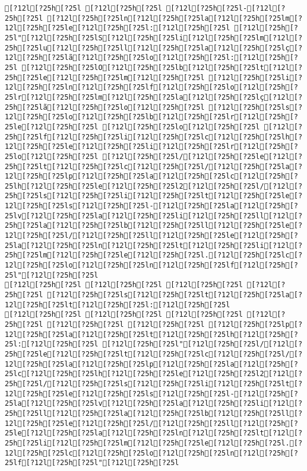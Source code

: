 \documentclass{scrartcl}
\begin{document}
\begin{Verbatim}
[?12l[?25h[?25l [?12l[?25h[?25l [?12l[?25h[?25l-[?12l[?25h[?25l [?12l[?25h[?25ln[?12l[?25h[?25la[?12l[?25h[?25lm[?12l[?25h[?25le[?12l[?25h[?25l:[?12l[?25h[?25l [?12l[?25h[?25l"[?12l[?25h[?25lS[?12l[?25h[?25li[?12l[?25h[?25lm[?12l[?25h[?25lu[?12l[?25h[?25ll[?12l[?25h[?25la[?12l[?25h[?25lç[?12l[?25h[?25lã[?12l[?25h[?25lo[?12l[?25h[?25l:[?12l[?25h[?25l [?12l[?25h[?25lO[?12l[?25h[?25lb[?12l[?25h[?25lt[?12l[?25h[?25le[?12l[?25h[?25lm[?12l[?25h[?25l [?12l[?25h[?25li[?12l[?25h[?25ln[?12l[?25h[?25lf[?12l[?25h[?25lo[?12l[?25h[?25lr[?12l[?25h[?25lm[?12l[?25h[?25la[?12l[?25h[?25lç[?12l[?25h[?25lã[?12l[?25h[?25lo[?12l[?25h[?25l [?12l[?25h[?25ls[?12l[?25h[?25lo[?12l[?25h[?25lb[?12l[?25h[?25lr[?12l[?25h[?25le[?12l[?25h[?25l [?12l[?25h[?25lo[?12l[?25h[?25l [?12l[?25h[?25lf[?12l[?25h[?25li[?12l[?25h[?25lc[?12l[?25h[?25lh[?12l[?25h[?25le[?12l[?25h[?25li[?12l[?25h[?25lr[?12l[?25h[?25lo[?12l[?25h[?25l [?12l[?25h[?25l/[?12l[?25h[?25le[?12l[?25h[?25lt[?12l[?25h[?25lc[?12l[?25h[?25l/[?12l[?25h[?25la[?12l[?25h[?25lp[?12l[?25h[?25la[?12l[?25h[?25lc[?12l[?25h[?25lh[?12l[?25h[?25le[?12l[?25h[?25l2[?12l[?25h[?25l/[?12l[?25h[?25ls[?12l[?25h[?25li[?12l[?25h[?25lt[?12l[?25h[?25le[?12l[?25h[?25ls[?12l[?25h[?25l-[?12l[?25h[?25la[?12l[?25h[?25lv[?12l[?25h[?25la[?12l[?25h[?25li[?12l[?25h[?25ll[?12l[?25h[?25la[?12l[?25h[?25lb[?12l[?25h[?25ll[?12l[?25h[?25le[?12l[?25h[?25l/[?12l[?25h[?25ll[?12l[?25h[?25le[?12l[?25h[?25la[?12l[?25h[?25ln[?12l[?25h[?25lt[?12l[?25h[?25li[?12l[?25h[?25lm[?12l[?25h[?25le[?12l[?25h[?25l.[?12l[?25h[?25lc[?12l[?25h[?25lo[?12l[?25h[?25ln[?12l[?25h[?25lf[?12l[?25h[?25l"[?12l[?25h[?25l
[?12l[?25h[?25l [?12l[?25h[?25l [?12l[?25h[?25l [?12l[?25h[?25l [?12l[?25h[?25ls[?12l[?25h[?25lt[?12l[?25h[?25la[?12l[?25h[?25lt[?12l[?25h[?25l:[?12l[?25h[?25l
[?12l[?25h[?25l [?12l[?25h[?25l [?12l[?25h[?25l [?12l[?25h[?25l [?12l[?25h[?25l [?12l[?25h[?25l [?12l[?25h[?25lp[?12l[?25h[?25la[?12l[?25h[?25lt[?12l[?25h[?25lh[?12l[?25h[?25l:[?12l[?25h[?25l [?12l[?25h[?25l"[?12l[?25h[?25l/[?12l[?25h[?25le[?12l[?25h[?25lt[?12l[?25h[?25lc[?12l[?25h[?25l/[?12l[?25h[?25la[?12l[?25h[?25lp[?12l[?25h[?25la[?12l[?25h[?25lc[?12l[?25h[?25lh[?12l[?25h[?25le[?12l[?25h[?25l2[?12l[?25h[?25l/[?12l[?25h[?25ls[?12l[?25h[?25li[?12l[?25h[?25lt[?12l[?25h[?25le[?12l[?25h[?25ls[?12l[?25h[?25l-[?12l[?25h[?25la[?12l[?25h[?25lv[?12l[?25h[?25la[?12l[?25h[?25li[?12l[?25h[?25ll[?12l[?25h[?25la[?12l[?25h[?25lb[?12l[?25h[?25ll[?12l[?25h[?25le[?12l[?25h[?25l/[?12l[?25h[?25ll[?12l[?25h[?25le[?12l[?25h[?25la[?12l[?25h[?25ln[?12l[?25h[?25lt[?12l[?25h[?25li[?12l[?25h[?25lm[?12l[?25h[?25le[?12l[?25h[?25l.[?12l[?25h[?25lc[?12l[?25h[?25lo[?12l[?25h[?25ln[?12l[?25h[?25lf[?12l[?25h[?25l"[?12l[?25h[?25l

\end{Verbatim}
\end{document}
